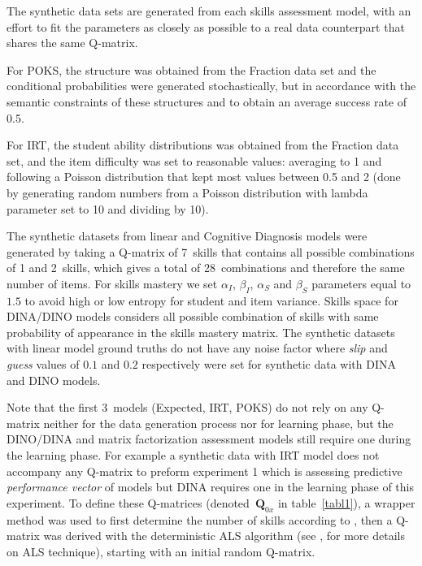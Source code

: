 The synthetic data sets are generated from each skills assessment model, with an effort to fit the parameters as closely as possible to a real data counterpart that shares the same Q-matrix. 

For POKS, the structure was obtained from the Fraction data set and the conditional probabilities were generated stochastically, but in accordance with the semantic constraints of these structures and to obtain an average success rate of 0.5.

For IRT, the student ability distributions was obtained from the Fraction data set, and the item difficulty was set to reasonable values: averaging to 1 and following a Poisson distribution that kept most values between 0.5 and 2 (done by generating random numbers from a Poisson distribution with lambda parameter set to 10 and dividing by 10). 

The synthetic datasets from linear and Cognitive Diagnosis models were generated by taking a Q-matrix of 7~skills that contains all possible combinations of 1 and 2~skills, which gives a total of 28~combinations and therefore the same number of items. For skills mastery we set $\alpha_I$, $\beta_I$, $\alpha_S$ and $\beta_S$ parameters equal to $1.5$ to avoid high or low entropy for student and item variance. Skills space for DINA/DINO models considers all possible combination of skills with same probability of appearance in the skills mastery matrix. 
The synthetic datasets with linear model ground truths do not have any noise factor where \textit{slip} and \textit{guess} values of $0.1$ and $0.2$ respectively were set for synthetic data with DINA and DINO models.

Note that the first 3~models (Expected, IRT, POKS) do not rely on any Q-matrix neither for the data generation process nor for learning phase, but the DINO/DINA and matrix factorization assessment models still require one during the learning phase. For example a synthetic data with IRT model does not accompany any Q-matrix to preform experiment 1 which is assessing predictive \textit{performance vector} of models but DINA requires one in the learning phase of this experiment. To define these Q-matrices (denoted~$\mathbf{Q}_{0x}$ in table~\ref{tabl1}), a wrapper method was used to first determine the number of skills according to \citet{Beheshti2012Numbers}, then a Q-matrix was derived with the deterministic ALS algorithm (see \citealp{Desmarais2013aied}, for more details on ALS technique), starting with an initial random Q-matrix.



